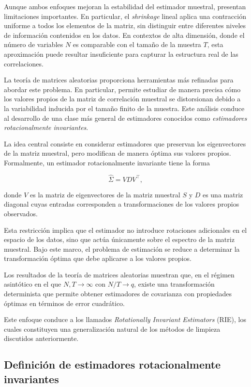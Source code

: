 \documentclass[letterpaper,12pt,oneside]{book}
\begin{document}
Aunque ambos enfoques mejoran la estabilidad del estimador muestral, presentan limitaciones importantes. En particular, el \textit{shrinkage} lineal aplica una contracción uniforme a todos los elementos de la matriz, sin distinguir entre diferentes niveles de información contenidos en los datos. En contextos de alta dimensión, donde el número de variables $N$ es comparable con el tamaño de la muestra $T$, esta aproximación puede resultar insuficiente para capturar la estructura real de las correlaciones.

La teoría de matrices aleatorias proporciona herramientas más refinadas para abordar este problema. En particular, permite estudiar de manera precisa cómo los valores propios de la matriz de correlación muestral se distorsionan debido a la variabilidad inducida por el tamaño finito de la muestra. Este análisis conduce al desarrollo de una clase más general de estimadores conocidos como \textit{estimadores rotacionalmente invariantes}.

La idea central consiste en considerar estimadores que preservan los eigenvectores de la matriz muestral, pero modifican de manera óptima sus valores propios. Formalmente, un estimador rotacionalmente invariante tiene la forma

\[
\hat{\Sigma} = V D V^\top,
\]

donde $V$ es la matriz de eigenvectores de la matriz muestral $S$ y $D$ es una matriz diagonal cuyas entradas corresponden a transformaciones de los valores propios observados.

Esta restricción implica que el estimador no introduce rotaciones adicionales en el espacio de los datos, sino que actúa únicamente sobre el espectro de la matriz muestral. Bajo este marco, el problema de estimación se reduce a determinar la transformación óptima que debe aplicarse a los valores propios.

Los resultados de la teoría de matrices aleatorias muestran que, en el régimen asintótico en el que $N,T \to \infty$ con $N/T \to q$, existe una transformación determinista que permite obtener estimadores de covarianza con propiedades óptimas en términos de error cuadrático.

Este enfoque conduce a los llamados \textit{Rotationally Invariant Estimators} (RIE), los cuales constituyen una generalización natural de los métodos de limpieza discutidos anteriormente.

\subsection*{Definición de estimadores rotacionalmente invariantes}
\end{document}
